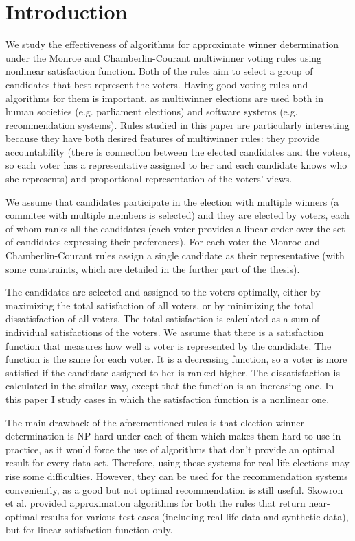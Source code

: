 \chapter{Introduction}
\label{cha:introduction}

We study the effectiveness of algorithms for approximate winner determination under the Monroe and Chamberlin-Courant multiwinner voting rules using nonlinear satisfaction function. Both of the rules aim to select a group of candidates that best represent the voters. Having good voting rules and algorithms for them is important, as multiwinner elections are used both in human societies (e.g. parliament elections) and software systems (e.g. recommendation systems). Rules studied in this paper are particularly interesting because they have both desired features of multiwinner rules: they provide accountability (there is connection between the elected candidates and the voters, so each voter has a representative assigned to her and each candidate knows who she represents) and proportional representation of the voters’ views.

We assume that candidates participate in the election with multiple winners (a commitee with multiple members is selected) and they are elected by voters, each of whom ranks all the candidates (each voter provides a linear order over the set of candidates expressing their preferences). For each voter the Monroe and Chamberlin-Courant rules assign a single candidate as their representative (with some constraints, which are detailed in the further part of the thesis).

The candidates are selected and assigned to the voters optimally, either by maximizing the total satisfaction of all voters, or by minimizing the total dissatisfaction of all voters.
The total satisfaction is calculated as a sum of individual satisfactions of the voters. We assume that there is a  satisfaction function that measures how well a voter is represented by the candidate. The function is the same for each voter. It is a decreasing function, so a voter is more satisfied if the candidate assigned to her is ranked higher. The dissatisfaction is calculated in the similar way, except that the function is an increasing one. In this paper I study cases in which the satisfaction function is a nonlinear one.

The main drawback of the aforementioned rules is that election winner determination is NP-hard under each of them \cite{2} which makes them hard to use in practice, as it would force the use of algorithms that don’t provide an optimal result for every data set. Therefore, using these systems for real-life elections may rise some difficulties. However, they can be used for the recommendation systems conveniently, as a good but not optimal recommendation is still useful. Skowron et al. \cite{1} provided approximation algorithms for both the rules that return near-optimal results for various test cases (including real-life data and synthetic data), but for linear satisfaction function only.

